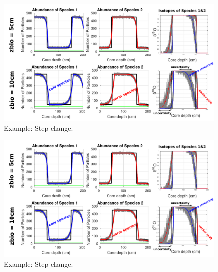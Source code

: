 \documentclass[a4paper,oneside,9pt]{article}
\begin{document}
\begin{figure}[hbp]
\begin{center}
	\includegraphics[width=1.0\textwidth]{../figures/../figures/stepchange2_5+10cm_background.pdf}
	\caption{Example: Step change.}\label{fig:5pointevent}
\end{center}
\end{figure}


\begin{figure}[hbp]
\begin{center}
	\includegraphics[width=1.0\textwidth]{../figures/../figures/stepchange2_5+10cm_background.pdf}
	\caption{Example: Step change.}\label{fig:5pointevent}
\end{center}
\end{figure}
\end{document}
